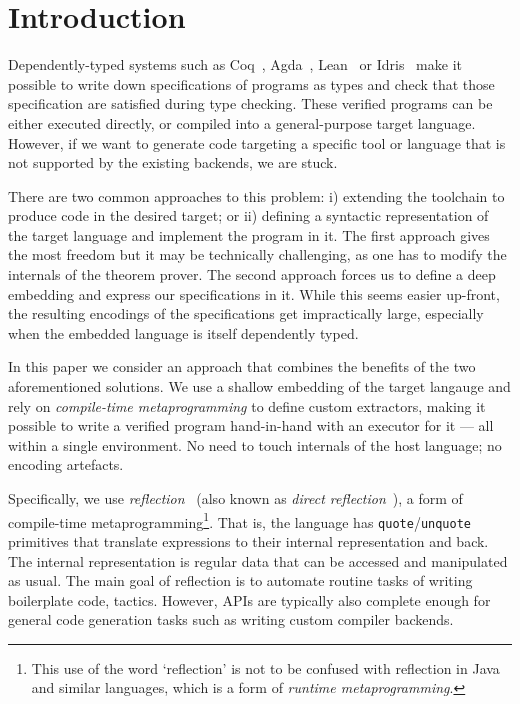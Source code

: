 \documentclass[acmsmall,review,anonymous]{acmart}\settopmatter{printfolios=true,printccs=false,printacmref=false}
\begin{document}
\section{Introduction}

Dependently-typed systems such as Coq~\cite{10.5555/1965123},
Agda~\cite{10.5555/1813347.1813352}, Lean~\cite{conf/cade/MouraKADR15}
or Idris~\cite{JFP:9060502} make it possible to write down specifications
of programs as types and check that those specification are satisfied
during type checking. These verified programs can be either executed
directly, or compiled into a
general-purpose target language.  However, if we want to generate code
targeting a specific tool or language that is not supported by the
existing backends, we are stuck.

There are two common approaches to this problem: i) extending the
toolchain to produce code in the desired target; or ii) defining
a syntactic representation of the target language and implement
the program in it.  The first approach gives the most freedom but it
may be technically challenging, as one has to modify the internals of
the theorem prover.  The second approach forces us to define
a deep embedding and express our specifications in it.  While this
seems easier up-front, the resulting encodings of the specifications
get impractically large, especially when the embedded language is
itself dependently typed.

In this paper we consider an approach that combines the benefits of
the two aforementioned solutions. We use a shallow embedding of the
target langauge and rely on \emph{compile-time
metaprogramming} to define custom extractors, making it possible to
write a verified program hand-in-hand with an executor for it --- all
within a single environment.  No need to touch internals of the host
language; no encoding artefacts.

Specifically, we use
\emph{reflection}~\cite{idris-refl, lean-refl,metacoq,agda-refl} (also
known as \emph{direct reflection}~\cite{nuprl-refl}), a form of
compile-time metaprogramming\footnote{This use of the word
`reflection' is not to be confused with reflection in Java and similar
languages, which is a form of \emph{runtime metaprogramming}.}.
%
That is, the language has \texttt{quote}/\texttt{unquote}
primitives that translate expressions to their internal representation
and back.  The internal representation is regular data that can be
accessed and manipulated as usual.  The main goal of
reflection is to automate routine tasks of writing
boilerplate code, \eg{} tactics.  However,  APIs are
typically also complete enough for general
code generation tasks such as writing custom compiler backends.
\end{document}
